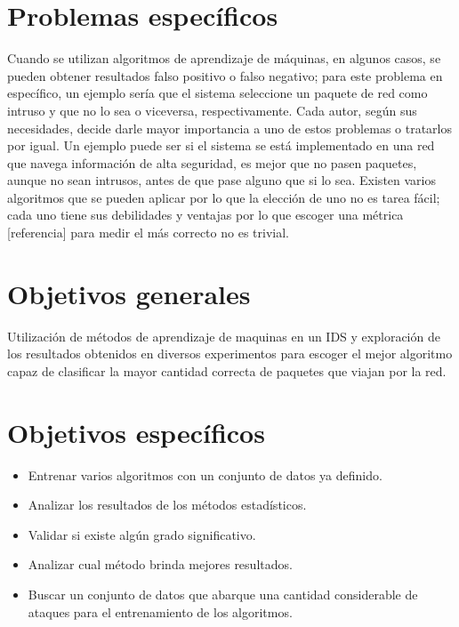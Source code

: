 \section*{Problemas específicos}
Cuando se utilizan algoritmos de aprendizaje de máquinas, en algunos casos, se pueden obtener resultados falso positivo o falso negativo; para este problema en específico, un ejemplo sería que el sistema seleccione un paquete de red como intruso y que no lo sea o viceversa, respectivamente. Cada autor, según sus necesidades, decide darle mayor importancia a uno de estos problemas o tratarlos por igual. Un ejemplo puede ser si el sistema se está implementado en una red que navega información de alta seguridad, es mejor que no pasen paquetes, aunque no sean intrusos, antes de que pase alguno que si lo sea. Existen varios algoritmos que se pueden aplicar por lo que la elección de uno no es tarea fácil; cada uno tiene sus debilidades y ventajas por lo que escoger una métrica [referencia] para medir el más correcto no es trivial.

\section*{Objetivos generales}
Utilización de métodos de aprendizaje de maquinas en un IDS y exploración de los resultados obtenidos en diversos experimentos para escoger el mejor algoritmo capaz de clasificar la mayor cantidad correcta de paquetes que viajan por la red.

\section*{Objetivos específicos}
\begin{itemize}
    \item Entrenar varios algoritmos con un conjunto de datos ya definido.
    \item Analizar los resultados de los métodos estadísticos.
    \item Validar si existe algún grado significativo.
    \item Analizar cual método brinda mejores resultados.
    \item Buscar un conjunto de datos que abarque una cantidad considerable de ataques para el entrenamiento de los algoritmos.
\end{itemize}


